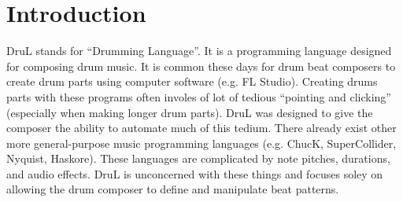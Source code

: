 
\chapter{Introduction}

DruL stands for ``Drumming Language''.  It is a programming language designed for composing drum music.  It is common these days for drum beat composers to create drum parts using computer software (e.g. FL Studio).  Creating drums parts with these programs often involes of lot of tedious ``pointing and clicking'' (especially when making longer drum parts).  DruL was designed to give the composer the ability to automate much of this tedium.  There already exist other more general-purpose music programming languages (e.g. ChucK, SuperCollider, Nyquist, Haskore).  These languages are complicated by note pitches, durations, and audio effects.  DruL is unconcerned with these things and focuses soley on allowing the drum composer to define and manipulate beat patterns.
